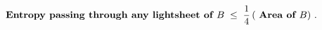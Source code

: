 \begin{equation}
\text{\bf Entropy passing through any lightsheet of } B \; \leq \;
\frac{1}{4} \left(\text{ \bf Area of } B\right) \, .
\end{equation}

